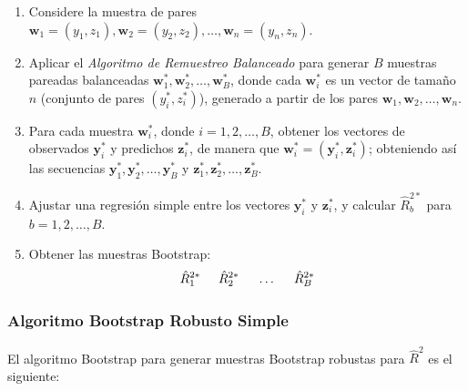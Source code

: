 \begin{enumerate}
	\item Considere la muestra de pares \( \mathbf{w}_{1} = (y_{1}, z_{1}), \mathbf{w}_{2} = (y_{2}, z_{2}), \dots, \mathbf{w}_{n} = (y_{n}, z_{n}) \).
	
	\item Aplicar el \textit{Algoritmo de Remuestreo Balanceado} para generar \( B \) muestras pareadas balanceadas \( \mathbf{w}^{*}_{1}, \mathbf{w}^{*}_{2}, \dots, \mathbf{w}^{*}_{B} \), donde cada \( \mathbf{w}^{*}_{i} \) es un vector de tamaño \( n \) (conjunto de pares \( (y_{i}^{*}, z_{i}^{*}) \)), generado a partir de los pares \( \mathbf{w}_{1}, \mathbf{w}_{2}, \dots, \mathbf{w}_{n} \).
	
	\item Para cada muestra \( \mathbf{w}^{*}_{i} \), donde \( i = 1, 2, \dots, B \), obtener los vectores de observados \( \mathbf{y}^{*}_{i} \) y predichos \( \mathbf{z}^{*}_{i} \), de manera que \( \mathbf{w}^{*}_{i} = (\mathbf{y}_{i}^{*}, \mathbf{z}_{i}^{*}) \); obteniendo así las secuencias \( \mathbf{y}_{1}^{*}, \mathbf{y}_{2}^{*}, \dots, \mathbf{y}_{B}^{*} \) y \( \mathbf{z}_{1}^{*}, \mathbf{z}_{2}^{*}, \dots, \mathbf{z}_{B}^{*} \).
	
	\item Ajustar una regresión simple entre los vectores \( \mathbf{y}^{*}_{i} \) y \( \mathbf{z}_{i}^{*} \), y calcular \( \hat{R}^{2*}_{b} \) para \( b = 1, 2, \dots, B \).
	
	\item Obtener las muestras Bootstrap:
	\[
	\hat{R}^{2*}_{1} \hspace{.5cm} \hat{R}^{2*}_{2} \hspace{.5cm} \dots \hspace{.5cm} \hat{R}^{2*}_{B}
	\]
\end{enumerate}



\subsubsection{Algoritmo Bootstrap Robusto Simple \parencite{zacarias-2023} }
El algoritmo Bootstrap para generar muestras Bootstrap robustas para $\hat{R}^{2}$ es el siguiente:


